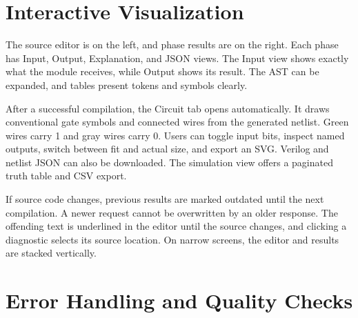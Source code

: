 \documentclass[conference]{IEEEtran}
\begin{document}
\section{Interactive Visualization}
The source editor is on the left, and phase results are on the right. Each phase has Input, Output, Explanation, and JSON views. The Input view shows exactly what the module receives, while Output shows its result. The AST can be expanded, and tables present tokens and symbols clearly.

After a successful compilation, the Circuit tab opens automatically. It draws conventional gate symbols and connected wires from the generated netlist. Green wires carry 1 and gray wires carry 0. Users can toggle input bits, inspect named outputs, switch between fit and actual size, and export an SVG. Verilog and netlist JSON can also be downloaded. The simulation view offers a paginated truth table and CSV export.

If source code changes, previous results are marked outdated until the next compilation. A newer request cannot be overwritten by an older response. The offending text is underlined in the editor until the source changes, and clicking a diagnostic selects its source location. On narrow screens, the editor and results are stacked vertically.

\section{Error Handling and Quality Checks}
\end{document}
